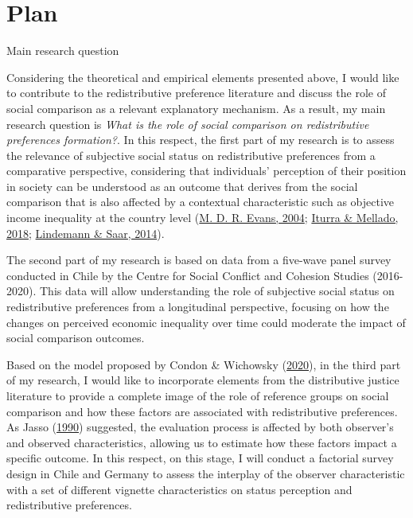 \documentclass[
  12pt,
]{book}
\begin{document}
\hypertarget{plan}{%
\chapter{Plan}\label{plan}}

Main research question

Considering the theoretical and empirical elements presented above, I would like to contribute to the redistributive preference literature and discuss the role of social comparison as a relevant explanatory mechanism. As a result, my main research question is \emph{What is the role of social comparison on redistributive preferences formation?}. In this respect, the first part of my research is to assess the relevance of subjective social status on redistributive preferences from a comparative perspective, considering that individuals' perception of their position in society can be understood as an outcome that derives from the social comparison that is also affected by a contextual characteristic such as objective income inequality at the country level (\protect\hyperlink{ref-Evans2004}{M. D. R. Evans, 2004}; \protect\hyperlink{ref-IturraMellado2019}{Iturra \& Mellado, 2018}; \protect\hyperlink{ref-Lindemann2014}{Lindemann \& Saar, 2014}).

The second part of my research is based on data from a five-wave panel survey conducted in Chile by the Centre for Social Conflict and Cohesion Studies (2016-2020). This data will allow understanding the role of subjective social status on redistributive preferences from a longitudinal perspective, focusing on how the changes on perceived economic inequality over time could moderate the impact of social comparison outcomes.

Based on the model proposed by Condon \& Wichowsky (\protect\hyperlink{ref-Condon2020}{2020}), in the third part of my research, I would like to incorporate elements from the distributive justice literature to provide a complete image of the role of reference groups on social comparison and how these factors are associated with redistributive preferences. As Jasso (\protect\hyperlink{ref-Jasso1990}{1990}) suggested, the evaluation process is affected by both observer's and observed characteristics, allowing us to estimate how these factors impact a specific outcome. In this respect, on this stage, I will conduct a factorial survey design in Chile and Germany to assess the interplay of the observer characteristic with a set of different vignette characteristics on status perception and redistributive preferences.
\end{document}
